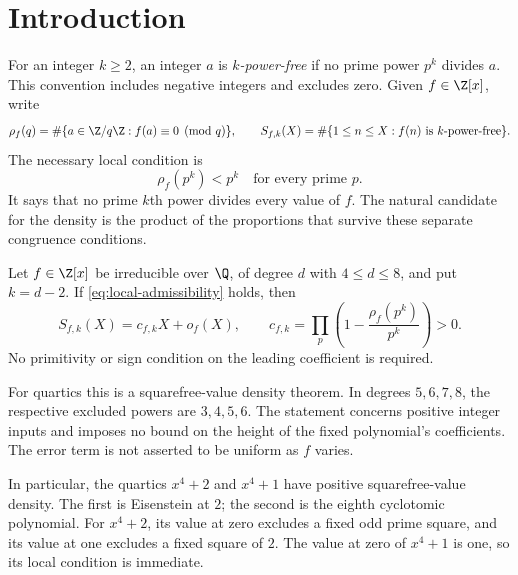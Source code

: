\begin{abstract}
We prove that every irreducible integer quartic with no fixed prime-square
divisor takes squarefree values with the predicted positive Euler-product
density. More generally, we obtain the corresponding $(d-2)$-power-free
density in degrees $4\le d\le8$. The proof combines number-field factorization,
determinant estimates with adaptive auxiliary primes, and explicit
low-degree geometry. Together with Browning's theorem for higher degrees,
this gives the $(d-2)$-power-free density for every $d\ge4$.
\end{abstract}

\section{Introduction}
\label{sec:introduction}

For an integer $k\ge2$, an integer $a$ is \emph{$k$-power-free} if no prime
power $p^k$ divides $a$. This convention includes negative integers and
excludes zero. Given $f\in\Z[x]$, write
\[
 \rho_f(q)=\#\{a\in\Z/q\Z:f(a)\equiv0\pmod q\},\qquad
 S_{f,k}(X)=\#\{1\le n\le X:f(n)\text{ is $k$-power-free}\}.
\]
The necessary local condition is
\begin{equation}
 \rho_f(p^k)<p^k\quad\text{for every prime }p.
 \label{eq:local-admissibility}
\end{equation}
It says that no prime $k$th power divides every value of $f$. The natural
candidate for the density is the product of the proportions that survive
these separate congruence conditions.

\begin{theorem}\label{thm:density}
Let $f\in\Z[x]$ be irreducible over $\Q$, of degree $d$ with
$4\le d\le8$, and put $k=d-2$. If \eqref{eq:local-admissibility} holds,
then
\[
 S_{f,k}(X)=c_{f,k}X+o_f(X),\qquad
 c_{f,k}=\prod_p\left(1-\frac{\rho_f(p^k)}{p^k}\right)>0.
\]
No primitivity or sign condition on the leading coefficient is required.
\end{theorem}

For quartics this is a squarefree-value density theorem. In degrees
$5,6,7,8$, the respective excluded powers are $3,4,5,6$.
The statement concerns positive integer inputs and imposes no bound on
the height of the fixed polynomial's coefficients. The error term is not
asserted to be uniform as $f$ varies.

In particular, the quartics $x^4+2$ and $x^4+1$ have positive squarefree-value
density. The first is Eisenstein at $2$; the second is the eighth cyclotomic
polynomial. For $x^4+2$, its value at zero excludes a fixed odd prime square,
and its value at one excludes a fixed square of $2$. The value at zero
of $x^4+1$ is one, so its local condition is immediate.

